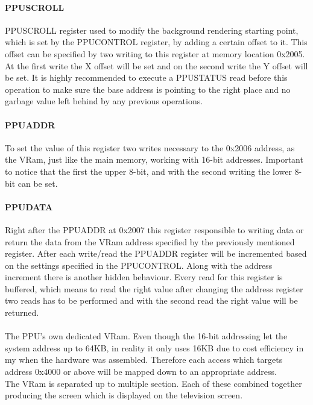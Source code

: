 \documentclass[]{report}
\begin{document}
\paragraph{PPUSCROLL}
PPUSCROLL register used to modify the background rendering starting point, which is set by the PPUCONTROL register, by adding a certain offset to it. This offset can be specified by two writing to this register at memory location 0x2005. At the first write the X offset will be set and on the second write the Y offset will be set. It is highly recommended to execute a PPUSTATUS read before this operation to make sure the base address is pointing to the right place and no garbage value left behind by any previous operations.

\paragraph{PPUADDR}
To set the value of this register two writes necessary to the 0x2006 address, as the VRam, just like the main memory, working with 16-bit addresses. Important to notice that the first the upper 8-bit, and with the second writing the lower 8-bit can be set.

\paragraph{PPUDATA}
Right after the PPUADDR at 0x2007 this register responsible to writing data or return the data from the VRam address specified by the previously mentioned register. After each write/read the PPUADDR register will be incremented based on the settings specified in the PPUCONTROL. Along with the address increment there is another hidden behaviour. Every read for this register is buffered, which means to read the right value after changing the address register two reads has to be performed and with the second read the right value will be returned.

\paragraph{ } 
The PPU's own dedicated VRam. Even though the 16-bit addressing let the system address up to 64KB,  in reality it only uses 16KB due to cost efficiency in my when the hardware was assembled.
Therefore each access which targets address 0x4000 or above will be mapped down to an appropriate address.
\\
The VRam is separated up to multiple section. Each of these combined together producing the screen which is displayed on the television screen.
\end{document}
